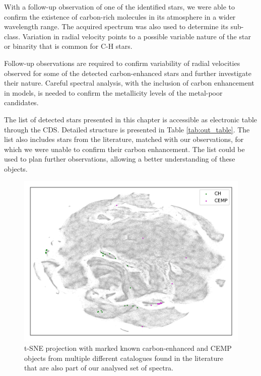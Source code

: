 With a follow-up observation of one of the identified stars, we were able to confirm the existence of carbon-rich molecules in its atmosphere in a wider wavelength range. The acquired spectrum was also used to determine its sub-class. Variation in radial velocity points to a possible variable nature of the star or binarity that is common for C-H stars.

Follow-up observations are required to confirm variability of radial velocities observed for some of the detected carbon-enhanced stars and further investigate their nature. Careful spectral analysis, with the inclusion of carbon enhancement in models, is needed to confirm the metallicity levels of the metal-poor candidates. 

The list of detected stars presented in this chapter is accessible as electronic table through the CDS. Detailed structure is presented in Table \ref{tab:out_table}. The list also includes stars from the literature, matched with our observations, for which we were unable to confirm their carbon enhancement. The list could be used to plan further observations, allowing a better understanding of these objects.

\begin{figure}
	\centering
	\includegraphics[width=\textwidth]{tsne_refpapers.png}
	\caption{t-SNE projection with marked known carbon-enhanced and CEMP objects from multiple different catalogues found in the literature that are also part of our analysed set of spectra.}
	\label{fig:tsne_ref_ch}
\end{figure}


